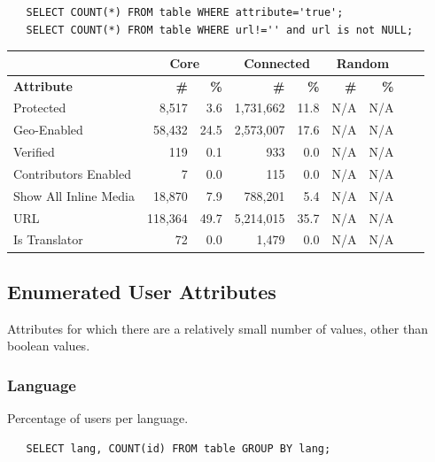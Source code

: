\begin{verbatim}
   SELECT COUNT(*) FROM table WHERE attribute='true';
   SELECT COUNT(*) FROM table WHERE url!='' and url is not NULL;
\end{verbatim}

\begin{tabular}{| l | r | r | r | r | r | r | r | r |}
\hline
& \multicolumn{2}{|c|}{\textbf{Core}} & \multicolumn{2}{|c|}{\textbf{Connected}} & \multicolumn{2}{|c|}{\textbf{Random}} \\ \hline
\textbf{Attribute} & \textbf{\#} & \textbf{\%} & \textbf{\#} & \textbf{\%} & \textbf{\#} & \textbf{\%} \\ \hline
Protected & 8,517 & 3.6 & 1,731,662 & 11.8 & N/A & N/A \\ \hline
Geo-Enabled & 58,432 & 24.5 & 2,573,007 & 17.6 & N/A & N/A \\ \hline
Verified & 119 & 0.1 & 933 & 0.0 & N/A & N/A \\ \hline
Contributors Enabled & 7 & 0.0 & 115 & 0.0 & N/A & N/A \\ \hline
Show All Inline Media & 18,870 & 7.9 & 788,201 & 5.4 & N/A & N/A \\ \hline
URL & 118,364 & 49.7 & 5,214,015  & 35.7 & N/A & N/A \\ \hline
Is Translator & 72 & 0.0 & 1,479 & 0.0 & N/A & N/A \\ \hline
\end{tabular}

\subsection{Enumerated User Attributes}
Attributes for which there are a relatively small number of values, other than boolean values.
\subsubsection{Language}
Percentage of users per language.

\begin{verbatim}
   SELECT lang, COUNT(id) FROM table GROUP BY lang;
\end{verbatim}


